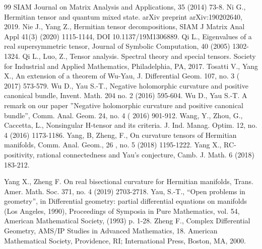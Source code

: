 \documentclass[10pt,reqno]{amsart}
\theoremstyle{definition}
\begin{document}
\begin{thebibliography}{99}
SIAM Journal on Matrix Analysis and Applications, 35 (2014) 73-8.
 Ni G., Hermitian tensor and quantum mixed state. arXiv preprint
arXiv:190202640, 2019.
 Nie J., Yang Z., Hermitian tensor decompositions, SIAM J Matrix Anal Appl
41(3) (2020) 1115-1144, DOI 10.1137/19M1306889.
 Qi L., Eigenvalues of a real supersymmetric tensor, Journal of Symbolic Computation, 40 (2005)
1302-1324.
 Qi L., Luo, Z., Tensor analysis. Spectral theory and special tensors. Society for Industrial and Applied Mathematics, Philadelphia, PA, 2017. 
 Tosatti V., Yang X., An extension of a theorem of Wu-Yau, J. Differential Geom. 107, no. 3 ( 2017)
573-579.
 Wu D., Yau S.-T., Negative holomorphic curvature and positive canonical bundle, Invent. Math. 204
 no. 2 (2016) 595-604.
 Wu D., Yau S.-T. A remark on our paper ”Negative holomorphic curvature and positive canonical
bundle”, Comm. Anal. Geom. 24, no. 4 ( 2016) 901-912.
 Wang, Y., Zhou, G., Caccetta, L., Nonsingular H-tensor and its criteria. J. Ind. Manag. Optim. 12, no. 4 (2016) 1173-1186.
  Yang, B,  Zheng, F., On curvature tensors of Hermitian manifolds, Comm. Anal. Geom., 26 , no. 5 (2018) 1195-1222.
  Yang X., RC-positivity, rational connectedness and Yau’s conjecture, Camb. J. Math. 6 (2018) 183-212.

 Yang X., Zheng F. On real bisectional curvature for Hermitian manifolds, Trans. Amer. Math. Soc.
371, no. 4 (2019) 2703-2718.
 Yau, S.-T., “Open problems in geometry”, in Differential geometry: partial differential
equations on manifolds (Los Angeles, 1990), Proceedings of Symposia in Pure
Mathematics, vol. 54, American Mathematical Society, (1993) p. 1-28.
  Zheng F., Complex Differential Geometry, AMS/IP Studies in Advanced Mathematics, 18. American
Mathematical Society, Providence, RI; International Press, Boston, MA, 2000.






\end{thebibliography}

	
\end{document}
